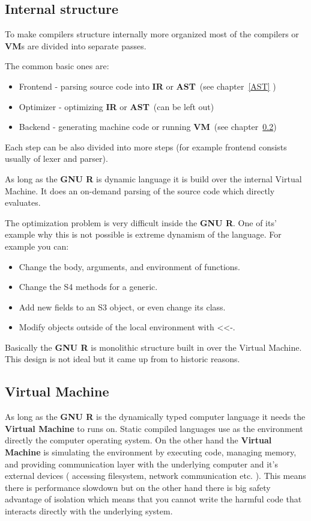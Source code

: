 \documentclass[thesis=M,english]{FITthesis}[2018/10/20]
\begin{document}
\subsection{Internal structure}\label{Compiler-internal-structure}

To make compilers structure internally more organized most of the compilers or \textbf{VM}s are divided into separate passes.

The common basic ones are:
\begin{itemize}
	\item Frontend - parsing source code into \textbf{IR} or \textbf{AST}~(see chapter~\ref{AST} )
	\item Optimizer - optimizing \textbf{IR} or \textbf{AST}~(can be left out)
	\item Backend - generating machine code or running \textbf{VM}~(see chapter~\ref{VM})
\end{itemize}
Each step can be also divided into more steps (for example frontend consists usually of lexer and parser).

As long as the \textbf{GNU R} is dynamic language it is build over the internal Virtual Machine. It does an on-demand parsing of the source code which directly evaluates.

The optimization problem is very difficult inside the \textbf{GNU R}. One of its' example why this is not possible is extreme dynamism of the language. For example you can:
\begin{itemize}
	\item Change the body, arguments, and environment of functions.
	\item Change the S4 methods for a generic.
	\item Add new fields to an S3 object, or even change its class.
	\item Modify objects outside of the local environment with <<-.
\end{itemize}

Basically the \textbf{GNU R} is monolithic structure built in over the Virtual Machine. This design is not ideal but it came up from to historic reasons.

\subsection{Virtual Machine}\label{VM}

As long as the \textbf{GNU R} is the dynamically typed computer language it needs the \textbf{Virtual Machine} to runs on. Static compiled languages use as the environment directly the computer operating system.
On the other hand the \textbf{Virtual Machine} is simulating the environment by executing code, managing memory, and providing communication layer with the underlying computer and it's external devices ( accessing filesystem, network communication etc. ). This means there is performance slowdown but on the other hand there is big safety advantage of isolation which means that you cannot write the harmful code that interacts directly with the underlying system.
\end{document}
